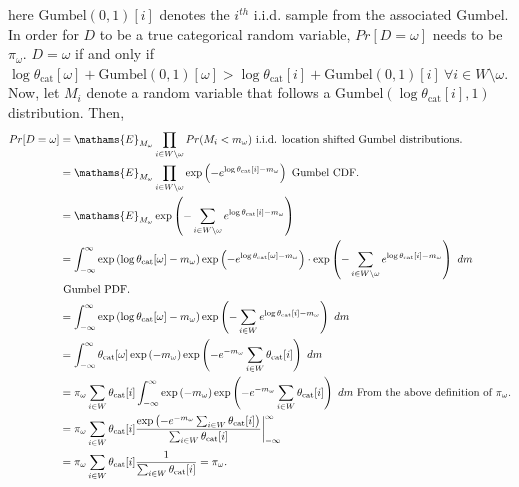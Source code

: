 \documentclass[
  11pt,
  letterpaper,
]{article}
\begin{document}
here \(\text{Gumbel}(0, 1)[i]\) denotes the \(i^{th}\) i.i.d. sample
from the associated Gumbel. In order for \(D\) to be a true categorical
random variable, \(Pr[D = \omega]\) needs to be \(\pi_\omega\).
\(D = \omega\) if and only if
\(\log \theta_\text{cat}[\omega] + \text{Gumbel}(0,1)[\omega] > \log \theta_\text{cat}[i] + \text{Gumbel}(0, 1)[i] \ \forall i \in W \setminus \omega\).
Now, let \(M_i\) denote a random variable that follows a
\(\text{Gumbel}(\log \theta_\text{cat}[i], 1)\) distribution. Then,
\begin{align*}
    Pr[D = \omega] 
        &= \mathams{E}_{M_\omega} 
            \prod_{i \in W \setminus \omega} Pr(M_i < m_\omega) 
            \text{ i.i.d. location shifted Gumbel distributions.} \\ 
        &= \mathams{E}_{M_\omega} 
            \prod_{i \in W \setminus \omega} \exp 
                \left(-e^{\log \theta_\text{cat}[i] - m_\omega} \right)
            \text{ Gumbel CDF.} \\ 
        &= \mathams{E}_{M_\omega} 
            \exp \left(-\sum_{i \in W \setminus \omega}
            e^{\log \theta_\text{cat}[i] - m_\omega} \right) \\ 
        &= \int_{-\infty}^{\infty}
            \exp \left( \log \theta_\text{cat}[\omega] - m_\omega \right) 
            \exp \left(-e^{\log \theta_\text{cat}[\omega] - m_\omega} \right) \cdot 
            \exp \left (-\sum_{i \in W \setminus \omega}
            e^{\log \theta_\text{cat}[i] - m_\omega} \right) \ dm \\
            &\text{ Gumbel PDF.} \\
        &= \int_{-\infty}^{\infty}
            \exp \left( \log \theta_\text{cat}[\omega] - m_\omega \right) 
            \exp \left (-\sum_{i \in W}
            e^{\log \theta_\text{cat}[i] - m_\omega} \right) \ dm \\
        &= \int_{-\infty}^{\infty}
            \theta_\text{cat}[\omega] 
            \exp \left( -m_\omega \right) 
            \exp \left( -e^{-m_\omega} \sum_{i \in W}
                \theta_\text{cat}[i]  \right) \ dm \\
        &= \pi_\omega \sum_{i \in W} \theta_\text{cat}[i]
        \int_{-\infty}^{\infty}
            \exp \left( -m_\omega \right) 
            \exp \left( -e^{-m_\omega} \sum_{i \in W}
                \theta_\text{cat}[i]  \right) \ dm 
                \text{ From the above definition of } \pi_\omega. \\
        &= \pi_\omega \sum_{i \in W} \theta_\text{cat}[i]
            \dfrac{\exp\left( -e^{-m_\omega} \sum_{i \in W} \theta_\text{cat}[i] \right)
                }{\sum_{i \in W} \theta_\text{cat}[i]} \bigg|_{-\infty}^\infty \\ 
        &= \pi_\omega \sum_{i \in W} \theta_\text{cat}[i]
            \dfrac{1}{\sum_{i \in W} \theta_\text{cat}[i]} = \pi_\omega. 
\end{align*}
\end{document}

